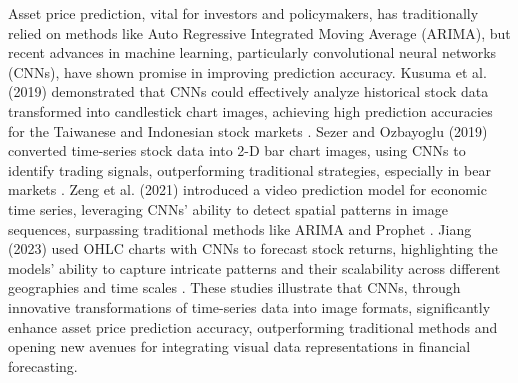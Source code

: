 \thesisspacing %


Asset price prediction, vital for investors and policymakers, has traditionally relied on methods like Auto Regressive Integrated Moving Average (ARIMA), but recent advances in machine learning, particularly convolutional neural networks (CNNs), have shown promise in improving prediction accuracy. Kusuma et al. (2019) demonstrated that CNNs could effectively analyze historical stock data transformed into candlestick chart images, achieving high prediction accuracies for the Taiwanese and Indonesian stock markets \cite{kusuma2019using}. Sezer and Ozbayoglu (2019) converted time-series stock data into 2-D bar chart images, using CNNs to identify trading signals, outperforming traditional strategies, especially in bear markets \cite{sezer2019financial}. Zeng et al. (2021) introduced a video prediction model for economic time series, leveraging CNNs' ability to detect spatial patterns in image sequences, surpassing traditional methods like ARIMA and Prophet \cite{zeng2021deep}. Jiang (2023) used OHLC charts with CNNs to forecast stock returns, highlighting the models' ability to capture intricate patterns and their scalability across different geographies and time scales \cite{jiang2023reimagining}. These studies illustrate that CNNs, through innovative transformations of time-series data into image formats, significantly enhance asset price prediction accuracy, outperforming traditional methods and opening new avenues for integrating visual data representations in financial forecasting.